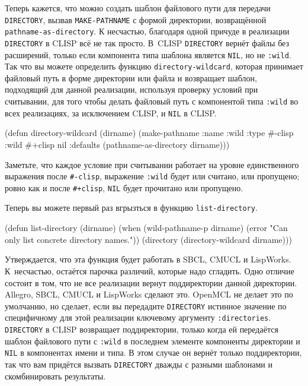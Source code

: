 Теперь кажется, что можно создать шаблон файлового пути для передачи \lstinline{DIRECTORY},
вызвав \lstinline{MAKE-PATHNAME} с формой директории, возвращённой
\lstinline{pathname-as-directory}. К несчастью, благодаря одной причуде в реализации
\lstinline{DIRECTORY} в CLISP всё не так просто. В~CLISP \lstinline{DIRECTORY} вернёт файлы без
расширений, только если компонента типа шаблона является \lstinline{NIL}, но не
\lstinline{:wild}. Так что вы можете определить функцию \lstinline{directory-wildcard}, которая
принимает файловый путь в форме директории или файла и возвращает шаблон, подходящий для
данной реализации, используя проверку условий при считывании, для того чтобы делать
файловый путь с компонентой типа \lstinline{:wild} во всех реализациях, за исключением CLISP, и
\lstinline{NIL} в CLISP.

\begin{myverb}
  (defun directory-wildcard (dirname)
    (make-pathname
     :name :wild
     :type #-clisp :wild #+clisp nil
     :defaults (pathname-as-directory dirname)))
\end{myverb}

Заметьте, что каждое условие при считывании работает на уровне единственного выражения
после \lstinline!#-clisp!, выражение \lstinline{:wild} будет или считано, или пропущено; ровно
как и после \lstinline!#+clisp!, \lstinline{NIL} будет прочитано или пропущено.

Теперь вы можете первый раз вгрызться в функцию \lstinline{list-directory}.

\begin{myverb}
  (defun list-directory (dirname)
    (when (wild-pathname-p dirname)
      (error "Can only list concrete directory names."))
    (directory (directory-wildcard dirname)))
\end{myverb}

Утверждается, что эта функция будет работать в SBCL, CMUCL и LispWorks. К~несчастью,
остаётся парочка различий, которые надо сгладить. Одно отличие состоит в том, что не все
реализации вернут поддиректории данной директории. Allegro, SBCL, CMUCL и LispWorks
сделают это. OpenMCL не делает это по умолчанию, но сделает, если вы передадите
\lstinline{DIRECTORY} истинное значение по специфичному для этой реализации ключевому аргументу
\lstinline{:directories}. \lstinline{DIRECTORY} в CLISP возвращает поддиректории, только когда ей
передаётся шаблон файлового пути с \lstinline{:wild} в последнем элементе компоненты директории
и \lstinline{NIL} в компонентах имени и типа. В этом случае он вернёт только поддиректории,
так что вам придётся вызвать \lstinline{DIRECTORY} дважды с разными шаблонами и скомбинировать
результаты.

